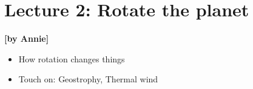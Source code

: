 
\section{Lecture 2: Rotate the planet}\label{sec:lecture2}
\begin{flushright}\textbf{[by Annie]}\end{flushright}
  
 \begin{itemize}
   \item
   How rotation changes things
   \item
   Touch on: Geostrophy, Thermal wind
\end{itemize}
